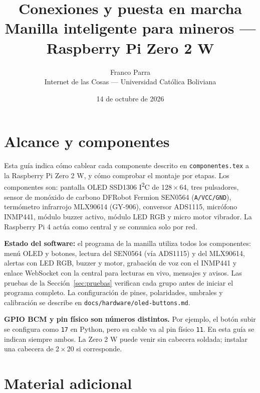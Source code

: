 \documentclass[11pt,a4paper]{article}
\title{\textbf{Conexiones y puesta en marcha}\\[0.3cm]
  \large Manilla inteligente para mineros --- Raspberry Pi Zero 2 W}
\author{Franco Parra\\\small Internet de las Cosas --- Universidad Católica Boliviana}
\date{14 de octubre de 2026}
\newcommand{\iic}{I\textsuperscript{2}C}
\begin{document}
\maketitle

\section{Alcance y componentes}

Esta guía indica cómo cablear cada componente descrito en
\texttt{componentes.tex} a la Raspberry Pi Zero 2 W, y cómo comprobar el montaje
por etapas. Los componentes son: pantalla OLED SSD1306 \iic{} de
128\,$\times$\,64, tres pulsadores, sensor de monóxido de carbono DFRobot
Fermion SEN0564 (\texttt{A/VCC/GND}), termómetro infrarrojo MLX90614 (GY-906), conversor ADS1115,
micrófono INMP441, módulo buzzer activo, módulo LED RGB y micro motor vibrador.
La Raspberry Pi 4 actúa como central y se comunica solo por red.

\textbf{Estado del software:} el programa de la manilla utiliza todos los
componentes: menú OLED y botones, lectura del SEN0564 (vía ADS1115) y del
MLX90614, alertas con LED RGB, buzzer y motor, grabación de voz con el INMP441 y
enlace WebSocket con la central para lecturas en vivo, mensajes y avisos. Las
pruebas de la Sección~\ref{sec:pruebas} verifican cada grupo antes de iniciar el
programa completo. La configuración de pines, polaridades, umbrales y
calibración se describe en \texttt{docs/hardware/oled-buttons.md}.

\textbf{GPIO BCM y pin físico son números distintos.} Por ejemplo, el botón
subir se configura como \texttt{17} en Python, pero su cable va al pin físico
\texttt{11}. En esta guía se indican siempre ambos. La Zero 2 W puede venir sin
cabecera soldada; instalar una cabecera de 2\,$\times$\,20 si
corresponde.\cite{rpi-hardware}

\section{Material adicional}
\end{document}
